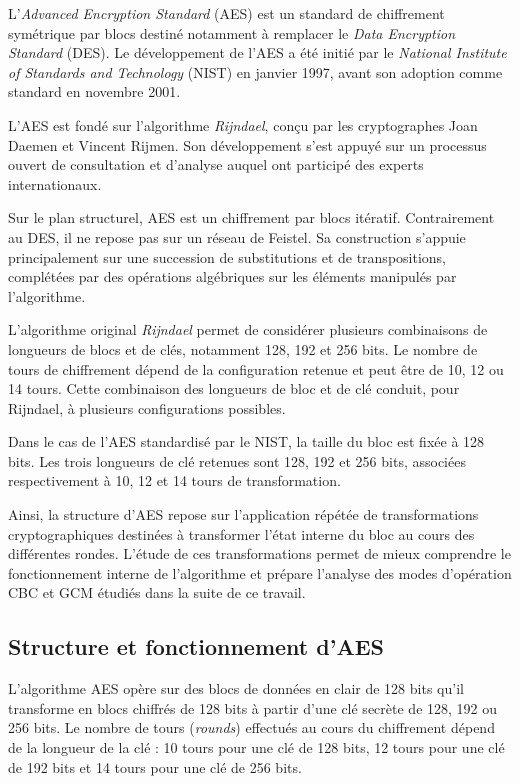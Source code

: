 \documentclass[12pt,a4paper]{article}
\begin{document}
L'\textit{Advanced Encryption Standard} (AES) est un standard de
chiffrement symétrique par blocs destiné notamment à remplacer le
\textit{Data Encryption Standard} (DES). Le développement de l'AES a
été initié par le \textit{National Institute of Standards and
Technology} (NIST) en janvier 1997, avant son adoption comme standard
en novembre 2001.

L'AES est fondé sur l'algorithme \textit{Rijndael}, conçu par les
cryptographes Joan Daemen et Vincent Rijmen. Son développement s'est
appuyé sur un processus ouvert de consultation et d'analyse auquel ont
participé des experts internationaux.

Sur le plan structurel, AES est un chiffrement par blocs itératif.
Contrairement au DES, il ne repose pas sur un réseau de Feistel.
Sa construction s'appuie principalement sur une succession de
substitutions et de transpositions, complétées par des opérations
algébriques sur les éléments manipulés par l'algorithme.

L'algorithme original \textit{Rijndael} permet de considérer plusieurs
combinaisons de longueurs de blocs et de clés, notamment 128, 192 et
256 bits. Le nombre de tours de chiffrement dépend de la configuration
retenue et peut être de 10, 12 ou 14 tours. Cette combinaison des
longueurs de bloc et de clé conduit, pour Rijndael, à plusieurs
configurations possibles.

Dans le cas de l'AES standardisé par le NIST, la taille du bloc est
fixée à 128 bits. Les trois longueurs de clé retenues sont 128, 192 et
256 bits, associées respectivement à 10, 12 et 14 tours de
transformation.

Ainsi, la structure d'AES repose sur l'application répétée de
transformations cryptographiques destinées à transformer l'état
interne du bloc au cours des différentes rondes. L'étude de ces
transformations permet de mieux comprendre le fonctionnement interne
de l'algorithme et prépare l'analyse des modes d'opération CBC et GCM
étudiés dans la suite de ce travail.

\subsection{Structure et fonctionnement d'AES}


L'algorithme AES opère sur des blocs de données en clair de 128 bits
qu'il transforme en blocs chiffrés de 128 bits à partir d'une clé
secrète de 128, 192 ou 256 bits. Le nombre de tours (\textit{rounds})
effectués au cours du chiffrement dépend de la longueur de la clé :
10 tours pour une clé de 128 bits, 12 tours pour une clé de 192 bits
et 14 tours pour une clé de 256 bits.
\end{document}
